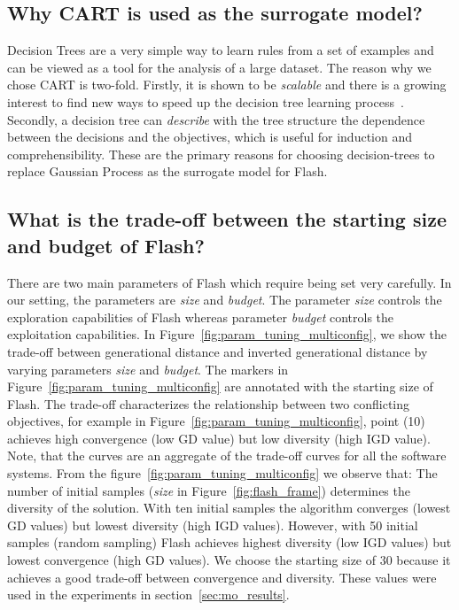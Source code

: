 \documentclass[10pt,journal,compsoc]{IEEEtran}
\newcommand{\flash}{{\sc Flash}\xspace}
\begin{document}


\subsection{Why CART is used as the surrogate model?}
Decision Trees are a very simple way to learn rules from a set of examples and can be viewed as a tool for the analysis of a large dataset. The reason why we chose CART is two-fold. Firstly, it is shown to be \textit{scalable} and there is a growing interest to find new ways to speed up the decision tree learning process~\cite{su2006fast}. 
Secondly, a decision tree can \textit{describe} with the tree structure the dependence between the decisions and the objectives, which is useful for induction and comprehensibility.
These are the primary reasons for choosing decision-trees to replace Gaussian Process as the surrogate model for \flash.

\subsection{What is the trade-off between the starting size and budget of {\sc \textbf{Flash}}?}\label{sec:parameter_tuning}



There are two main parameters of \flash which require being set very carefully. In our setting, the parameters are \textit{size} and \textit{budget}. The parameter \textit{size} controls the exploration capabilities of \flash whereas parameter \textit{budget} controls the exploitation capabilities. 
In Figure~\ref{fig:param_tuning_multiconfig}, we show the trade-off 
between generational distance and inverted generational distance 
by varying parameters \textit{size} and \textit{budget}. 
The markers in Figure~\ref{fig:param_tuning_multiconfig} are annotated with the starting size of \flash. The trade-off characterizes the relationship between two conflicting objectives, for example in Figure~\ref{fig:param_tuning_multiconfig}, point (10) achieves high convergence (low GD value) but low diversity (high IGD value). Note, that the curves are an aggregate of the trade-off curves for all the software systems. 
From the figure~\ref{fig:param_tuning_multiconfig} we observe that: The number of initial samples (\textit{size} in Figure~\ref{fig:flash_frame}) determines the diversity of the solution. With ten initial samples the algorithm converges (lowest GD values) but lowest diversity (high IGD values). However, with  50 initial samples (random sampling) \flash achieves highest diversity (low IGD values) but lowest convergence (high GD values). We choose the starting size of 30 because it achieves a good trade-off between convergence and diversity. These values were used in the experiments in section~\ref{sec:mo_results}.
\end{document}
